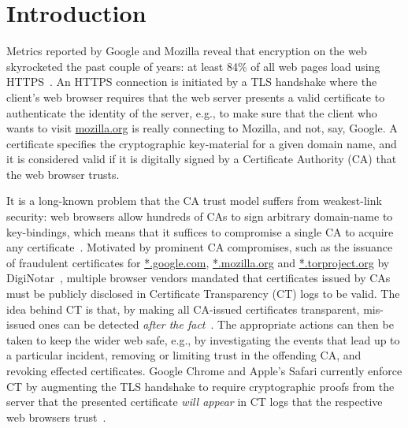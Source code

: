\section{Introduction} \label{sec:introduction}
Metrics reported by Google and Mozilla reveal that encryption on the web
skyrocketed the past couple of years: at least 84\% of all web pages load using
HTTPS~\cite{google-metrics,mozilla-metrics}. An HTTPS connection is initiated by
a TLS handshake where the client's web browser requires that the web server
presents a valid certificate to authenticate the identity of the server, e.g.,
to make sure that the client who wants to visit \url{mozilla.org} is really
connecting to Mozilla, and not, say, Google. A certificate specifies the
cryptographic key-material for a given domain name, and it is considered valid
if it is digitally signed by a Certificate Authority (CA) that the web browser
trusts.

It is a long-known problem that the CA trust model suffers from
weakest-link security:
	web browsers allow hundreds of CAs to sign arbitrary domain-name to
		key-bindings,
	which means that it suffices to compromise a single CA to acquire any
		certificate~\cite{ca-ecosystem,https-sok}.
Motivated by prominent CA compromises, such as the issuance of fraudulent
certificates for
	\url{*.google.com},
	\url{*.mozilla.org} and
	\url{*.torproject.org}
by DigiNotar~\cite{diginotar}, multiple browser vendors mandated
that certificates issued by CAs must be publicly disclosed in Certificate
Transparency (CT) logs to be valid.  The idea behind CT is that, by making all
CA-issued certificates transparent, mis-issued ones can be detected
\emph{after the fact}~\cite{ct/a,ct,ct/bis}.  The appropriate actions can then
be taken to keep the wider web safe, e.g., by
	investigating the events that lead up to a particular incident,
	removing or limiting trust in the offending CA, and
	revoking effected certificates.
Google Chrome and Apple's Safari currently enforce CT by augmenting the TLS
handshake to require cryptographic proofs from the server that the presented
certificate \emph{will appear} in CT logs that the respective web browsers
trust~\cite{chrome-policy,safari-policy}.

